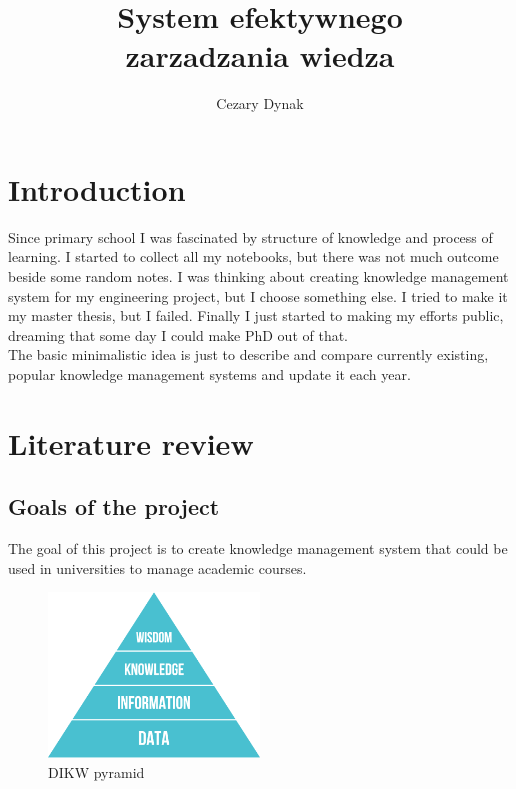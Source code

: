 \documentclass[printmode]{mgr}
\title{System efektywnego \\ zarzadzania wiedza}
\author{Cezary Dynak}
\begin{document}


\maketitle

\tableofcontents

\chapter{Introduction}

Since primary school I was fascinated by structure of knowledge and process of
learning. I started to collect all my notebooks, but there was not much outcome
beside some random notes. I was thinking about creating knowledge management
system for my engineering project, but I choose something else. I tried to make
it my master thesis, but I failed. Finally I just started to making my efforts
public, dreaming that some day I could make PhD out of that. \\

The basic minimalistic idea is just to describe and compare currently existing,
popular knowledge management systems and update it each year.

\chapter{Literature review}
\label{chapter:literature-review}
\section{Goals of the project}
The goal of this project is to create knowledge management system that could
be used in universities to manage academic courses. \cite{web:esco-api}

\begin{figure}[htbp]
  \centering
    \includegraphics[width=0.5\textwidth]{dikw-pyramid.png}
  \caption{DIKW pyramid}
  \label{fig:panel-dotykowy}
\end{figure}
\end{document}
